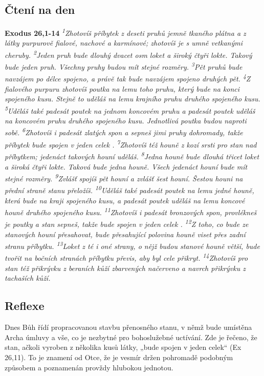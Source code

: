 \documentclass[11pt]{article}
\begin{document}
\subsection*{Čtení na den}
\textbf{Exodus 26,1-14}
\newline
\textit{
\textsuperscript{1}Zhotovíš příbytek z deseti pruhů jemně tkaného plátna a z látky purpurově fialové, nachové a karmínové; zhotovíš je s umně vetkanými cheruby.
\textsuperscript{2}Jeden pruh bude dlouhý dvacet osm loket a široký čtyři lokte. Takový bude jeden pruh. Všechny pruhy budou mít stejné rozměry.
\textsuperscript{3}Pět pruhů bude navzájem po délce spojeno, a právě tak bude navzájem spojeno druhých pět.
\textsuperscript{4}Z fialového purpuru zhotovíš poutka na lemu toho pruhu, který bude na konci spojeného kusu. Stejně to uděláš na lemu krajního pruhu druhého spojeného kusu.
\textsuperscript{5}Uděláš také padesát poutek na jednom koncovém pruhu a padesát poutek uděláš na koncovém pruhu druhého spojeného kusu. Jednotlivá poutka budou naproti sobě.
\textsuperscript{6}Zhotovíš i padesát zlatých spon a sepneš jimi pruhy dohromady, takže příbytek bude spojen v jeden celek .
\textsuperscript{7}Zhotovíš též houně z kozí srsti pro stan nad příbytkem; jedenáct takových houní uděláš.
\textsuperscript{8}Jedna houně bude dlouhá třicet loket a široká čtyři lokte. Taková bude jedna houně. Všech jedenáct houní bude mít stejné rozměry.
\textsuperscript{9}Zvlášť spojíš pět houní a zvlášť šest houní. Šestou houni na přední straně stanu přeložíš.
\textsuperscript{10}Uděláš také padesát poutek na lemu jedné houně, která bude na kraji spojeného kusu, a padesát poutek uděláš na lemu koncové houně druhého spojeného kusu.
\textsuperscript{11}Zhotovíš i padesát bronzových spon, provlékneš je poutky a stan sepneš, takže bude spojen v jeden celek .
\textsuperscript{12}Z toho, co bude ze stanových houní přesahovat, bude přesahující polovina houně viset přes zadní stranu příbytku.
\textsuperscript{13}Loket z té i oné strany, o nějž budou stanové houně větší, bude tvořit na bočních stranách příbytku převis, aby byl cele přikryt.
\textsuperscript{14}Zhotovíš pro stan též přikrývku z beraních kůží zbarvených načerveno a navrch přikrývku z tachaších kůží.
}

\subsection*{Reflexe}
Dnes Bůh řídí propracovanou stavbu přenosného stanu, v němž bude umístěna Archa úmluvy a vše, co je
nezbytné pro bohoslužebné uctívání. Zde je řečeno, že stan, ačkoli vyroben z několika kusů látky, „bude
spojen v jeden celek“ (Ex 26,11). To je znamení od Otce, že je vesmír držen pohromadě podobným
způsobem a poznamenán provždy hlubokou jednotou.
\end{document}
